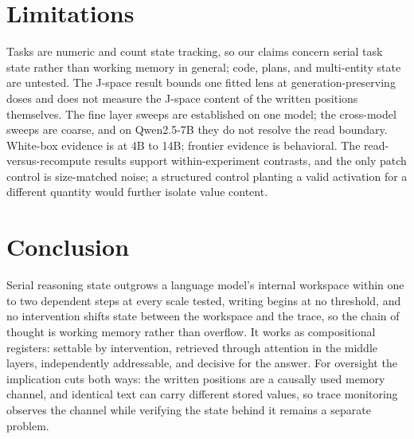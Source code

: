 \documentclass{article}
\begin{document}
\section{Limitations}

Tasks are numeric and count state tracking, so our claims concern serial task state rather than working memory in general; code, plans, and multi-entity state are untested. The J-space result bounds one fitted lens at generation-preserving doses and does not measure the J-space content of the written positions themselves. The fine layer sweeps are established on one model; the cross-model sweeps are coarse, and on Qwen2.5-7B they do not resolve the read boundary. White-box evidence is at 4B to 14B; frontier evidence is behavioral. The read-versus-recompute results support within-experiment contrasts, and the only patch control is size-matched noise; a structured control planting a valid activation for a different quantity would further isolate value content.

\section{Conclusion}

Serial reasoning state outgrows a language model's internal workspace within one to two dependent steps at every scale tested, writing begins at no threshold, and no intervention shifts state between the workspace and the trace, so the chain of thought is working memory rather than overflow. It works as compositional registers: settable by intervention, retrieved through attention in the middle layers, independently addressable, and decisive for the answer. For oversight the implication cuts both ways: the written positions are a causally used memory channel, and identical text can carry different stored values, so trace monitoring observes the channel while verifying the state behind it remains a separate problem.

{\footnotesize


}
\end{document}
